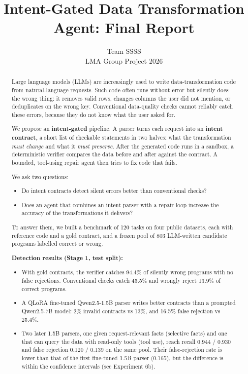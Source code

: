 \documentclass[11pt]{article}
\title{Intent-Gated Data Transformation Agent: Final Report}
\author{Team SSSS \\ LMA Group Project 2026}
\providecommand{\tightlist}{\setlength{\itemsep}{0pt}\setlength{\parskip}{0pt}}
\begin{document}
\maketitle
\begin{abstract}
Large language models (LLMs) are increasingly used to write
data-transformation code from natural-language requests. Such code often
runs without error but silently does the wrong thing: it removes valid
rows, changes columns the user did not mention, or deduplicates on the
wrong key. Conventional data-quality checks cannot reliably catch these
errors, because they do not know what the user asked for.

We propose an \textbf{intent-gated} pipeline. A parser turns each
request into an \textbf{intent contract}, a short list of checkable
statements in two halves: what the transformation \emph{must change} and
what it \emph{must preserve}. After the generated code runs in a
sandbox, a deterministic verifier compares the data before and after
against the contract. A bounded, tool-using repair agent then tries to
fix code that fails.

We ask two questions:

\begin{itemize}
\tightlist
\item
  Do intent contracts detect silent errors better than conventional
  checks?
\item
  Does an agent that combines an intent parser with a repair loop
  increase the accuracy of the transformations it delivers?
\end{itemize}

To answer them, we built a benchmark of 120 tasks on four public
datasets, each with reference code and a gold contract, and a frozen
pool of 803 LLM-written candidate programs labelled correct or wrong.

\textbf{Detection results (Stage 1, test split):}

\begin{itemize}
\tightlist
\item
  With gold contracts, the verifier catches 94.4\% of silently wrong
  programs with no false rejections. Conventional checks catch 45.5\%
  and wrongly reject 13.9\% of correct programs.
\item
  A QLoRA fine-tuned Qwen2.5-1.5B parser writes better contracts than a
  prompted Qwen2.5-7B model: 2\% invalid contracts vs 13\%, and 16.5\%
  false rejection vs 25.4\%.
\item
  Two later 1.5B parsers, one given request-relevant facts (selective
  facts) and one that can query the data with read-only tools (tool
  use), reach recall 0.944 / 0.930 and false rejection 0.120 / 0.139 on
  the same pool. Their false-rejection rate is lower than that of the
  first fine-tuned 1.5B parser (0.165), but the difference is within the
  confidence intervals (see Experiment 6b).
\end{itemize}


\end{abstract}
\end{document}
